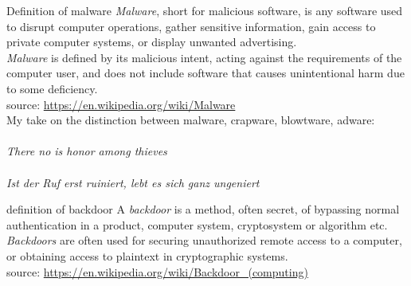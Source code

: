 \documentclass[11pt]{beamer}
\begin{document}
\begin{frame}{Definition of malware}
\emph{Malware}, short for malicious software, is any software used to disrupt computer operations, gather sensitive information, gain access to private computer systems, or display unwanted advertising.
\\[0.2cm]
\emph{Malware} is defined by its malicious intent, acting against the requirements of the computer user, and does not include software that causes unintentional harm due to some deficiency.
\\[0.1cm]
source: \href{https://en.wikipedia.org/wiki/Malware}{https://en.wikipedia.org/wiki/Malware}
\\[0.5cm]
\pause
My take on the distinction between malware, crapware, blowtware, adware:\\
\\[0.1cm]
\emph{There no is honor among thieves}\\
\\[0.1cm]
\emph{Ist der Ruf erst ruiniert, lebt es sich ganz ungeniert}
\end{frame}

\begin{frame}{definition of backdoor}
A \emph{backdoor} is a method, often secret, of bypassing normal authentication in a product, computer system, cryptosystem or algorithm etc.
\\[0.2cm]
\emph{Backdoors} are often used for securing unauthorized remote access to a computer, or obtaining access to plaintext in cryptographic systems.
\\[0.2cm]
source: \href{https://en.wikipedia.org/wiki/Backdoor\textunderscore(computing)}{https://en.wikipedia.org/wiki/Backdoor\_(computing)}
\end{frame}
\end{document}
